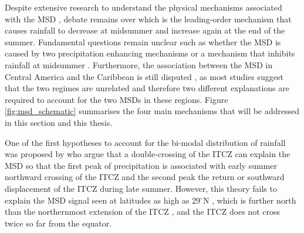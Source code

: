  Despite extensive research to understand the physical mechanisms associated with the MSD   \citep[e.g.][]{magana1999,giannini2000,gamble2008,herrera2015,maldonado2017,straffon2019}, debate remains over which is the leading-order mechanism that causes rainfall to decrease at midsummer and increase again at the end of the summer.  %
Fundamental questions remain unclear such  as whether the MSD is caused by two precipitation enhancing mechanisms \citep{karnauskas2013} or a mechanism that inhibits rainfall at midsummer \citep{duranquesada2017}. 
Furthermore, the association between the MSD in Central America and the Caribbean is still disputed \citep{gamble2008}, as most studies suggest that the two regimes are unrelated and therefore two different explanations are required to account for the two MSDs in these regions. 
Figure \ref{fig:msd_schematic} summarises the four main mechanisms that will be addressed in this section and this thesis. 


One of the first hypotheses to account for the bi-modal distribution of rainfall was proposed by \cite{hastenrath1967} who argue that a double-crossing of the ITCZ can explain the MSD so that the first peak of precipitation is associated with early summer northward crossing of the ITCZ and the second peak the return or southward displacement of the ITCZ during late summer.
However, this theory fails to explain the MSD signal seen at latitudes as high as 29$^\circ$N \citep{perdigon2018,zhao2020}, which is further north than the northernmost extension of the ITCZ \citep{schneider2014}, and the ITCZ does not cross twice so far from the equator. %

